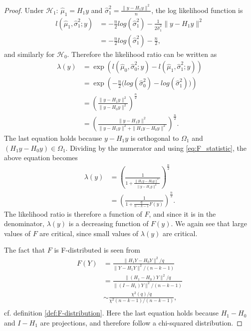 \begin{proof}
    Under $\mathcal{H}_1$: $\hat{\mu}_1 = H_1 y$ and $\hat{\sigma}_1^2 = \frac{\| y - H_1 y \|^2}{n}$, the log likelihood function is
    \begin{align*}
        l(\hat{\mu}_1, \hat{\sigma}_1^2; y) &= -\frac{n}{2} log(\hat{\sigma}_1^2) - \frac{1}{2 \hat{\sigma}_1^2} \| y - H_1 y \|^2 \\
        &= -\frac{n}{2} log(\hat{\sigma}_1^2) - \frac{n}{2},
    \end{align*}
    and similarly for $\mathcal{H}_0$. Therefore the likelihood ratio can be written as
    \begin{align*}
        \lambda(y) &= \exp \left( l(\hat{\mu}_0, \hat{\sigma}_0^2; y) - l(\hat{\mu}_1, \hat{\sigma}_1^2; y) \right) \\
        &= \exp \left( -\frac{n}{2} \Big( log(\hat{\sigma}_0^2) - log(\hat{\sigma}_1^2)\Big) \right) \\
        &= \left( \frac{\| y - H_1 y \|^2}{\| y - H_0 y \|^2} \right)^{\frac{n}{2}} \\
        &= \left( \frac{\| y - H_1 y \|^2}{\| y - H_1 y \|^2 + \| H_1 y - H_0 y \|^2} \right)^{\frac{n}{2}}.
    \end{align*}
    The last equation holds because $y - H_1 y$ is orthogonal to $\Omega_1$ and $(H_1 y - H_0 y) \in \Omega_1$. 
    Dividing by the numerator and using \eqref{eq:F_statistic}, the above equation becomes
    \begin{align*}
        \lambda(y) &= \left( \frac{1}{1 + \frac{\| H_1 y - H_0 y \|^2}{\| y - H_1 y \|^2}} \right)^{\frac{n}{2}} \\
        &= \left( \frac{1}{1 + \frac{q}{n-k-1}F(y)}  \right)^{\frac{n}{2}}.
    \end{align*}
    The likelihood ratio is therefore a function of $F$, and since it is in the denominator, $\lambda(y)$ is a decreasing function of $F(y)$. We again see that large values of $F$ are critical, since small values of $\lambda(y)$ are critical.
    
    The fact that $F$ is F-distributed is seen from
    \begin{align*}
        F(Y) &= \frac{\| H_1 Y - H_0 Y \|^2/q}{\| Y - H_1 Y \|^2/(n-k-1)} \\
        &= \frac{\| (H_1 - H_0) Y \|^2/q}{\| (I - H_1) Y \|^2/(n-k-1)} \\
        &\sim \frac{\chi^2(q)/q}{\chi^2(n-k-1)/(n-k-1)}, \\
    \end{align*}
    cf. definition \ref{def:F-distribution}. Here the last equation holds because $H_1 - H_0$ and $I - H_1$ are projections, and therefore follow a chi-squared distribution.
\end{proof}

